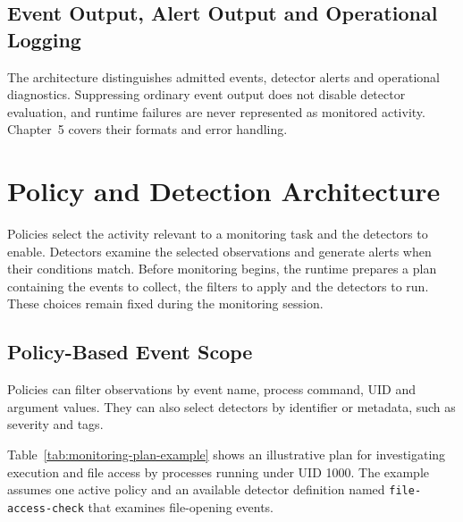 \subsection{Event Output, Alert Output and Operational Logging}
\label{subsec:event-alert-logging}

The architecture distinguishes admitted events, detector alerts and operational
diagnostics. Suppressing ordinary event output does not disable detector
evaluation, and runtime failures are never represented as monitored activity.
Chapter~5 covers their formats and error handling.

\section{Policy and Detection Architecture}
  \label{sec:policy-detection-architecture}

  Policies select the activity relevant to a monitoring task and the detectors
  to enable. Detectors examine the selected observations and generate alerts
  when their conditions match. Before monitoring begins, the runtime prepares
  a plan containing the events to collect, the filters to apply and the
  detectors to run. These choices remain fixed during the monitoring session.

  \subsection{Policy-Based Event Scope}
  \label{subsec:policy-based-event-scope}

  Policies can filter observations by event name, process command, UID and
  argument values. They can also select detectors by identifier or metadata,
  such as severity and tags.

  Table~\ref{tab:monitoring-plan-example} shows an illustrative plan for
  investigating execution and file access by processes running under UID 1000.
  The example assumes one active policy and an available detector definition
  named \texttt{file-access-check} that examines file-opening events.

